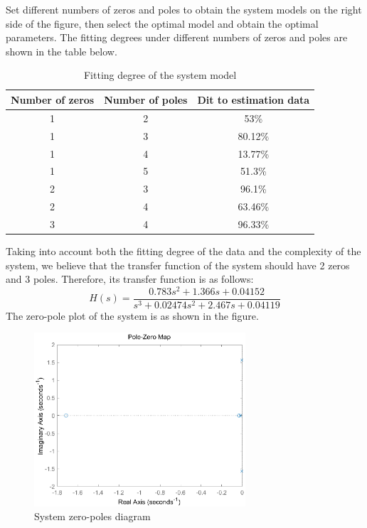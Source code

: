 \documentclass[11pt,a4paper]{article}%
\begin{document}
Set different numbers of zeros and poles to obtain the system models on the right side of the figure, then select the optimal model and obtain the optimal parameters. The fitting degrees under different numbers of zeros and poles are shown in the table below.
\begin{table}[H]
    \centering
    \caption{Fitting degree of the system model}
    \label{degree}
    \begin{tabular}{ccc}
    \toprule
    \textbf{Number of zeros} & \textbf{Number of poles} & \textbf{Dit to estimation data} \\
    \midrule
    1 & 2 & 53\% \\
    1 & 3 & 80.12\% \\
    1 & 4 & 13.77\% \\
    1 & 5 & 51.3\% \\
    2 & 3 & 96.1\% \\
    2 & 4 & 63.46\% \\
    3 & 4 & 96.33\% \\
    \bottomrule
    \end{tabular}
\end{table}
Taking into account both the fitting degree of the data and the complexity of the system, we believe that the transfer function of the system should have 2 zeros and 3 poles. Therefore, its transfer function is as follows:
\begin{equation}
    H(s)=\frac{0.783s^2 + 1.366s + 0.04152}{s^3 + 0.02474s^2 + 2.467s + 0.04119}
\end{equation}
The zero-pole plot of the system is as shown in the figure.
\begin{figure}[H]
    \centering
    \includegraphics[width=0.7\textwidth]{zeros}
    \caption{System zero-poles diagram}
    \label{zeros}
\end{figure}
\end{document}
